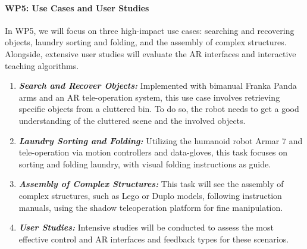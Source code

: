 \begin{refsection}
\vspace{-0.3cm}
\paragraph{WP5: Use Cases and User Studies}
In WP5, we will focus on three high-impact use cases: searching and recovering objects, laundry sorting and folding, and the assembly of complex structures. Alongside, extensive user studies will evaluate the AR interfaces and interactive teaching algorithms.

\begin{enumerate}[noitemsep, topsep=0pt, partopsep=0pt, label=\alph*), leftmargin=0em, itemindent=1em, labelindent=1em, labelwidth=*]
    \item \textit{\textbf{Search and Recover Objects:}} Implemented with bimanual Franka Panda arms and an AR tele-operation system, this use case involves retrieving specific objects from a cluttered bin. To do so, the robot needs to get a good understanding of the cluttered scene and the involved objects. 
    \item \textit{\textbf{Laundry Sorting and Folding:}} Utilizing the humanoid robot Armar 7 and tele-operation via motion controllers and data-gloves, this task focuses on sorting and folding laundry, with visual folding instructions as guide.
    \item \textit{\textbf{Assembly of Complex Structures:}} This task will see the assembly of complex structures, such as Lego or Duplo models, following instruction manuals, using the shadow teleoperation platform for fine manipulation.
    \item \textit{\textbf{User Studies:}} Intensive studies will be conducted to assess the most effective control and AR interfaces and feedback types for these scenarios.
\end{enumerate}


\end{refsection}
